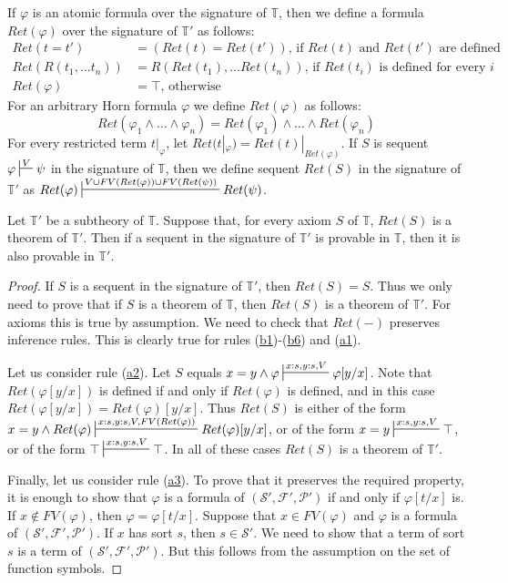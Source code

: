 \documentclass[reqno]{amsart}
\newcommand{\axref}[1]{(\hyperref[ax:#1]{#1})}
\theoremstyle{definition}
\theoremstyle{remark}
\numberwithin{figure}{section}
\begin{document}
If $\varphi$ is an atomic formula over the signature of $\mathbb{T}$, then we define a formula $Ret(\varphi)$ over the signature of $\mathbb{T}'$ as follows:
\begin{align*}
Ret(t = t') & = (Ret(t) = Ret(t')) \text{, if $Ret(t)$ and $Ret(t')$ are defined} \\
Ret(R(t_1, \ldots t_n)) & = R(Ret(t_1), \ldots Ret(t_n)) \text{, if $Ret(t_i)$ is defined for every $i$} \\
Ret(\varphi) & = \top \text{, otherwise}
\end{align*}
For an arbitrary Horn formula $\varphi$ we define $Ret(\varphi)$ as follows:
\[ Ret(\varphi_1 \land \ldots \land \varphi_n) = Ret(\varphi_1) \land \ldots \land Ret(\varphi_n) \]
For every restricted term $t|_\varphi$, let $Ret(t|_\varphi) = Ret(t)|_{Ret(\varphi)}$.
If $S$ is sequent $\varphi \sststile{}{V} \psi$ in the signature of $\mathbb{T}$,
then we define sequent $Ret(S)$ in the signature of $\mathbb{T}'$ as $Ret(\varphi) \sststile{}{V \cup FV(Ret(\varphi)) \cup FV(Ret(\psi))} Ret(\psi)$.

\begin{lem}[subtheory]
Let $\mathbb{T}'$ be a subtheory of $\mathbb{T}$.
Suppose that, for every axiom $S$ of $\mathbb{T}$, $Ret(S)$ is a theorem of $\mathbb{T}'$.
Then if a sequent in the signature of $\mathbb{T}'$ is provable in $\mathbb{T}$, then it is also provable in $\mathbb{T}'$.
\end{lem}
\begin{proof}
If $S$ is a sequent in the signature of $\mathbb{T}'$, then $Ret(S) = S$.
Thus we only need to prove that if $S$ is a theorem of $\mathbb{T}$, then $Ret(S)$ is a theorem of $\mathbb{T}'$.
For axioms this is true by assumption.
We need to check that $Ret(-)$ preserves inference rules.
This is clearly true for rules \axref{b1}-\axref{b6} and \axref{a1}.

Let us consider rule \axref{a2}.
Let $S$ equals $x = y \land \varphi \sststile{}{x:s,y:s,V} \varphi[y/x]$.
Note that $Ret(\varphi[y/x])$ is defined if and only if $Ret(\varphi)$ is defined, and in this case $Ret(\varphi[y/x]) = Ret(\varphi)[y/x]$.
Thus $Ret(S)$ is either of the form $x = y \land Ret(\varphi) \sststile{}{x:s,y:s,V,FV(Ret(\varphi))} Ret(\varphi)[y/x]$,
or of the form $x = y \sststile{}{x:s,y:s,V} \top$, or of the form $\top \sststile{}{x:s,y:s,V} \top$.
In all of these cases $Ret(S)$ is a theorem of $\mathbb{T}'$.

Finally, let us consider rule \axref{a3}.
To prove that it preserves the required property, it is enough to show that $\varphi$ is a formula of $(\mathcal{S}',\mathcal{F}',\mathcal{P}')$ if and only if $\varphi[t/x]$ is.
If $x \notin FV(\varphi)$, then $\varphi = \varphi[t/x]$.
Suppose that $x \in FV(\varphi)$ and $\varphi$ is a formula of $(\mathcal{S}',\mathcal{F}',\mathcal{P}')$.
If $x$ has sort $s$, then $s \in \mathcal{S}'$.
We need to show that a term of sort $s$ is a term of $(\mathcal{S}',\mathcal{F}',\mathcal{P}')$.
But this follows from the assumption on the set of function symbols.
\end{proof}
\end{document}
